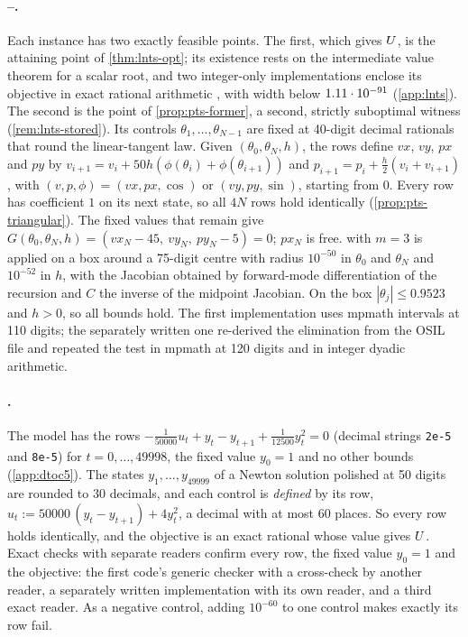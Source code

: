 \paragraph{--.}
Each instance has two exactly feasible points.
The first, which gives $U$, is the attaining point of \cref{thm:lnts-opt}; its existence rests on the intermediate value theorem for a scalar root, and two integer-only implementations enclose its objective in exact rational arithmetic , with width below $1.11\cdot 10^{-91}$ (\cref{app:lnts}).
The second is the point of \cref{prop:pts-former}, a second, strictly suboptimal witness (\cref{rem:lnts-stored}).
Its controls $\theta_1,\dots,\theta_{N-1}$ are fixed at 40-digit decimal rationals that round the linear-tangent law.
Given $(\theta_0,\theta_N,h)$, the rows define $vx$, $vy$, $px$ and $py$ by $v_{i+1}=v_i+50h(\phi(\theta_i)+\phi(\theta_{i+1}))$ and $p_{i+1}=p_i+\tfrac h2(v_i+v_{i+1})$, with $(v,p,\phi)=(vx,px,\cos)$ or $(vy,py,\sin)$, starting from $0$.
Every row has coefficient $1$ on its next state, so all $4N$ rows hold identically (\cref{prop:pts-triangular}).
The fixed values that remain give $G(\theta_0,\theta_N,h)=(vx_N-45,\ vy_N,\ py_N-5)=0$; $px_N$ is free.
 with $m=3$ is applied on a box around a 75-digit centre with radius $10^{-50}$ in $\theta_0$ and $\theta_N$ and $10^{-52}$ in $h$, with the Jacobian obtained by forward-mode differentiation of the recursion and $C$ the inverse of the midpoint Jacobian.
On the box $|\theta_j|\le0.9523$ and $h>0$, so all bounds hold.
The first implementation uses mpmath intervals at 110 digits; the separately written one re-derived the elimination from the OSIL file and repeated the test in mpmath at 120 digits and in integer dyadic arithmetic.

\paragraph{.}
The model has the rows $-\tfrac{1}{50000}u_t+y_t-y_{t+1}+\tfrac{1}{12500}y_t^2=0$ (decimal strings \texttt{2e-5} and \texttt{8e-5}) for $t=0,\dots,49998$, the fixed value $y_0=1$ and no other bounds (\cref{app:dtoc5}).
The states $y_1,\dots,y_{49999}$ of a Newton solution polished at 50 digits are rounded to 30 decimals, and each control is \emph{defined} by its row, $u_t:=50000\,(y_t-y_{t+1})+4y_t^2$, a decimal with at most 60 places.
So every row holds identically, and the objective is an exact rational whose value gives $U$.
Exact checks with separate readers confirm every row, the fixed value $y_0=1$ and the objective: the first code's generic checker with a cross-check by another reader, a separately written implementation with its own reader, and a third exact reader.
As a negative control, adding $10^{-60}$ to one control makes exactly its row fail.


